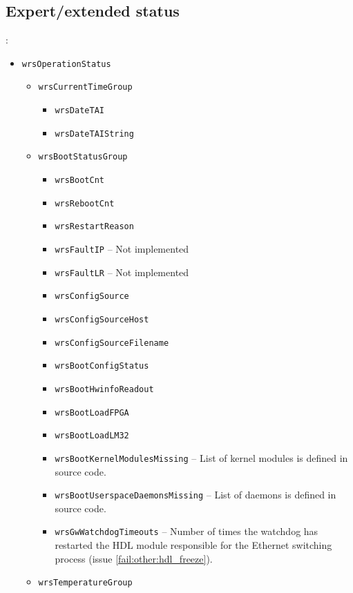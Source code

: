 \newpage
\subsection{Expert/extended status}
\label{sec:snmp_exports:expert}

:
\begin{itemize}
  \item \texttt{wrsOperationStatus}
    \begin{itemize}
      \item \texttt{wrsCurrentTimeGroup}
	\begin{itemize}
	  \item \texttt{wrsDateTAI}
	  \item \texttt{wrsDateTAIString}
	\end{itemize}
      \item \texttt{wrsBootStatusGroup}
	\begin{itemize}
	  \item \texttt{wrsBootCnt}
	  \item \texttt{wrsRebootCnt}
	  \item \texttt{wrsRestartReason}
	  \item \texttt{wrsFaultIP} -- Not implemented
	  \item \texttt{wrsFaultLR} -- Not implemented
	  \item \texttt{wrsConfigSource}
	  \item \texttt{wrsConfigSourceHost}
	  \item \texttt{wrsConfigSourceFilename}
	  \item \texttt{wrsBootConfigStatus}
	  \item \texttt{wrsBootHwinfoReadout}
	  \item \texttt{wrsBootLoadFPGA}
	  \item \texttt{wrsBootLoadLM32}
	  \item \texttt{wrsBootKernelModulesMissing} -- List of kernel modules
		is defined in source code.
	  \item \texttt{wrsBootUserspaceDaemonsMissing} -- List of daemons
		is defined in source code.
	  \item \texttt{wrsGwWatchdogTimeouts} -- Number of times the watchdog
		has restarted the HDL module responsible for the Ethernet
		switching process (issue \ref{fail:other:hdl_freeze}).
	\end{itemize}
      \item \texttt{wrsTemperatureGroup}
	\begin{itemize}

\end{itemize}
\end{itemize}
\end{itemize}
